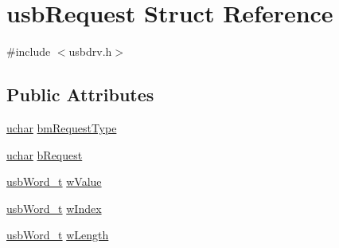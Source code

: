 \hypertarget{structusbRequest}{\section{usb\-Request Struct Reference}
\label{structusbRequest}
}


{\ttfamily \#include $<$usbdrv.\-h$>$}

\subsection*{Public Attributes}
\begin{DoxyCompactItemize}
\item 
\hyperlink{usbdrv_8h_aa8ddf20cdd716b652e76e23e5e700893}{uchar} \hyperlink{structusbRequest_a05c2e0d9ac30dce558bcd69a692314c0}{bm\-Request\-Type}
\item 
\hyperlink{usbdrv_8h_aa8ddf20cdd716b652e76e23e5e700893}{uchar} \hyperlink{structusbRequest_a34c18b1dd0af60774cac48b176220c2c}{b\-Request}
\item 
\hyperlink{usbdrv_8h_a992d37ca7c2980c180e963d4f78a30ea}{usb\-Word\-\_\-t} \hyperlink{structusbRequest_ab3f8687bb757c53ed03c3ce4310dc5c5}{w\-Value}
\item 
\hyperlink{usbdrv_8h_a992d37ca7c2980c180e963d4f78a30ea}{usb\-Word\-\_\-t} \hyperlink{structusbRequest_aefa059246bf079d5b42af148a2ad6a95}{w\-Index}
\item 
\hyperlink{usbdrv_8h_a992d37ca7c2980c180e963d4f78a30ea}{usb\-Word\-\_\-t} \hyperlink{structusbRequest_a770437881c2e37d1384982fe26d87e7f}{w\-Length}
\end{DoxyCompactItemize}



